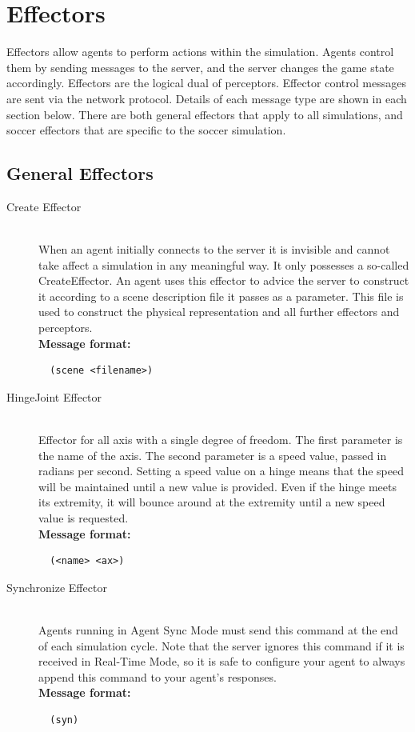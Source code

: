 \section{Effectors}
Effectors allow agents to perform actions within the simulation. Agents control them by sending messages to the server, and the server changes the game state accordingly. Effectors are the logical dual of perceptors.
Effector control messages are sent via the network protocol. Details of each message type are shown in each section below.
There are both general effectors that apply to all simulations, and soccer effectors that are specific to the soccer simulation.\\
\subsection{General Effectors}
\begin{description}
  \item [Create Effector] \hfill \\
  When an agent initially connects to the server it is invisible and cannot take affect a simulation in any meaningful way. It only possesses a so-called CreateEffector. An agent uses this effector to advice the server to construct it according to a scene description file it passes as a parameter. This file is used to construct the physical representation and all further effectors and perceptors.
  \hfill \\
{ \bf Message format:}
  \begin{verbatim}
  (scene <filename>)
  \end{verbatim}
  \item [HingeJoint Effector] \hfill \\
  Effector for all axis with a single degree of freedom. The first parameter is the name of the axis. The second parameter is a speed value, passed in radians per second. Setting a speed value on a hinge means that the speed will be maintained until a new value is provided. Even if the hinge meets its extremity, it will bounce around at the extremity until a new speed value is requested.
   \hfill \\
{ \bf Message format:}
  \begin{verbatim}
  (<name> <ax>)
  \end{verbatim}
  \item [Synchronize Effector] \hfill \\
  Agents running in Agent Sync Mode must send this command at the end of each simulation cycle. Note that the server ignores this command if it is received in Real-Time Mode, so it is safe to configure your agent to always append this command to your agent's responses.
  \hfill \\
{ \bf Message format:}
  \begin{verbatim}
  (syn)
  \end{verbatim}
\end{description}

